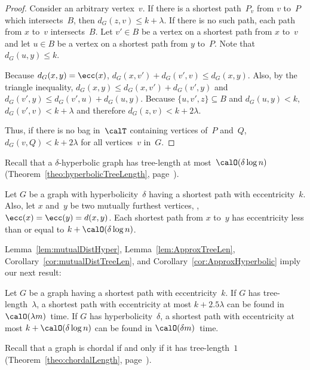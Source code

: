 \begin{proof}
Consider an arbitrary vertex~$v$.
If there is a shortest path~$P_v$ from $v$ to~$P$ which intersects~$B$, then $d_G(z, v) \leq k + \lambda$.
If there is no such path, each path from $x$ to~$v$ intersects~$B$.
Let $v' \in B$ be a vertex on a shortest path from $x$ to~$v$ and let $u \in B$ be a vertex on a shortest path from $y$ to~$P$.
Note that $d_G(u, y) \leq k$.

Because $d_G(x, y) = \ecc(x)$, $d_G(x, v') + d_G(v', v) \leq d_G(x, y)$.
Also, by the triangle inequality, $d_G(x, y) \leq d_G(x, v') + d_G(v', y)$ and $d_G(v', y) \leq d_G(v', u) + d_G(u, y)$.
Because $\{ u, v', z \} \subseteq B$ and $d_G(u, y) < k$, $d_G(v', v) < k + \lambda$ and therefore $d_G(z, v) < k + 2 \lambda$.

Thus, if there is no bag in~$\calT$ containing vertices of~$P$ and~$Q$, $d_G(v, Q) < k + 2 \lambda$ for all vertices~$v$ in~$G$.
\end{proof}

Recall that a $\delta$-hyperbolic graph has tree-length at most~$\calO(\delta \log n)$ (Theorem~\ref{theo:hyperbolicTreeLength}, page~\pageref{theo:hyperbolicTreeLength}).

\begin{corollary}
    \label{cor:ApproxHyperbolic}
Let \( G \) be a graph with hyperbolicity~\( \delta \) having a shortest path with eccentricity~\( k \).
Also, let \( x \) and~\( y \) be two mutually furthest vertices, \ie, \( \ecc(x) = \ecc(y) = d(x, y) \).
Each shortest path from \( x \) to~\( y \) has eccentricity less than or equal to \( k + \calO(\delta \log n) \).
\end{corollary}

Lemma~\ref{lem:mutualDistHyper}, Lemma~\ref{lem:ApproxTreeLen}, Corollary~\ref{cor:mutualDistTreeLen}, and Corollary~\ref{cor:ApproxHyperbolic} imply our next result:

\begin{theorem}
Let \( G \) be a graph having a shortest path with eccentricity~\( k \).
If \( G \) has tree-length~\( \lambda \), a shortest path with eccentricity at most \( k + 2.5\lambda \) can be found in \( \calO(\lambda m) \)~time.
If \( G \) has hyperbolicity~\( \delta \), a shortest path with eccentricity at most \( k + \calO(\delta \log n) \) can be found in \( \calO(\delta m) \)~time.
\end{theorem}

Recall that a graph is chordal if and only if it has tree-length~$1$ (Theorem~\ref{theo:chordalLength}, page~\pageref{theo:chordalLength}).


